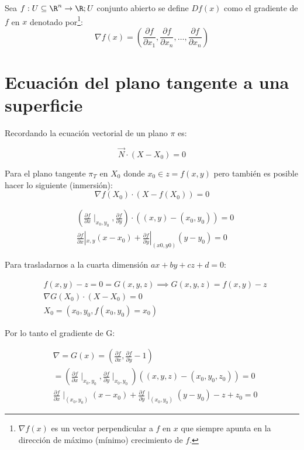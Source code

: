 \begin{definition}
	Sea $f:U\subseteq \R^n\to \R;U$ conjunto abierto se define $Df(x)$ como el gradiente de $f$ en $x$ denotado por\footnote{$\nabla f(x)$ es un vector perpendicular a $f$ en $x$ que siempre apunta en la dirección de máximo (mínimo) crecimiento de $f$.}:
	\begin{equation}
		\nabla f(x)=\left(\frac{\partial f}{\partial x_1},\frac{\partial f}{\partial x_n},\dots,\frac{\partial f}{\partial x_n}\right)
	\end{equation}
\end{definition}

\section{Ecuación del plano tangente a una superficie}

Recordando la ecuación vectorial de un plano $\pi$ es:

\begin{equation}
	\overrightarrow{N}\cdot \left(X-X_0\right)=0
\end{equation}

Para el plano tangente $\pi_T$ en $X_0$ donde $x_0\in z=f(x,y)$
pero también es posible hacer lo siguiente (inmersión):
\begin{equation}
	\nabla f(X_0)\cdot \left(X-f(X_0)\right)=0
\end{equation}

\begin{align*}
	 & \left(\frac{\partial f}{\partial x}\mid_{x_0,y_0},\frac{\partial f}{\partial y}\right)\cdot \left((x,y)-(x_0,y_0)\right)=0                 \\
	 & \frac{\partial f}{\partial x}\left\lvert_{x,y} \left(x-x_0\right)+\frac{\partial f}{\partial y}\right\rvert_{(x0,y0)} \left(y-y_0\right)=0
\end{align*}

Para trasladarnos a la cuarta dimensión $ax+by+cz+d=0$:

\begin{align*}
	 & f(x,y)-z=0=G(x,y,z)\implies G(x,y,z)=f(x,y)-z \\
	 & \nabla G(X_0)\cdot \left(X-X_0\right)=0       \\
	 & X_0=\left(x_0,y_0,f(x_0,y_0)=x_0\right)
\end{align*}

Por lo tanto el gradiente de G:

\begin{align*}
	 & \nabla= G(x)=\left(\frac{\partial f}{\partial x},\frac{\partial f}{\partial y}-1\right)                                                              \\
	 & =\left(\frac{\partial f}{\partial x}\mid_{x_0,y_0},\frac{\partial f}{\partial y}\mid_{x_0,y_0}\right)\left((x,y,z)-\left(x_0,y_0,z_0\right)\right)=0 \\
	 & \frac{\partial f}{\partial x}\mid_{(x_0,y_0)}(x-x_0)+\frac{\partial f}{\partial y}\mid_{(x_0,y_0)}\left(y-y_0\right)-z+z_0=0
\end{align*}

